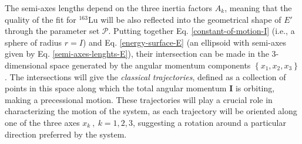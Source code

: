 The semi-axes lengths depend on the three inertia factors $A_k$, meaning that the quality of the fit for $^{163}$Lu will be also reflected into the geometrical shape of $E'$ through the parameter set $\mathcal{P}$. Putting together Eq. \ref{constant-of-motion-I} (i.e., a sphere of radius $r=I$) and Eq. \ref{energy-surface-E} (an ellipsoid with semi-axes given by Eq. \ref{semi-axes-lenghts-E}), their intersection can be made in the 3-dimensional space generated by the angular momentum components $\left\{x_1,x_2,x_3\right\}$. The intersections will give the \emph{classical trajectories}, defined as a collection of points in this space along which the total angular momentum $\mathbf{I}$ is orbiting, making a precessional motion. These trajectories will play a crucial role in characterizing the motion of the system, as each trajectory will be oriented along one of the three axes $x_k\ ,\ k=1,2,3$, suggesting a rotation around a particular direction preferred by the system.

